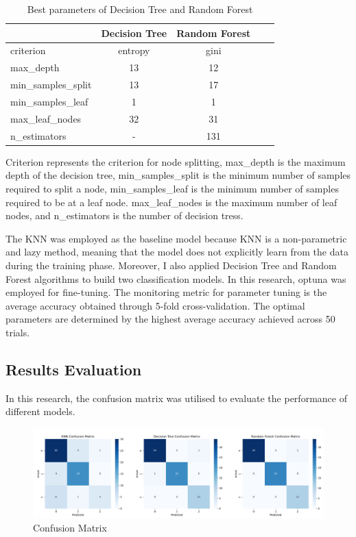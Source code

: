 \documentclass[a4paper,11pt]{article}
\begin{document}
\begin{table}[htbp]
	\centering
	\caption{Best parameters of Decision Tree and Random Forest}
	\begin{tabular}{lcccc}
		\toprule
		& Decision Tree & Random Forest\\
		\midrule
		criterion & entropy &gini \\
		max\_depth & 13 & 12\\
		min\_samples\_split & 13 & 17 \\
		min\_samples\_leaf & 1 & 1 \\
		max\_leaf\_nodes & 32 & 31 \\
        n\_estimators& - & 131 \\
		\bottomrule
	\end{tabular}
\end{table}


\noindent
Criterion represents the criterion for node splitting, max\_depth is the maximum depth of the decision tree,
min\_samples\_split is the minimum number of samples required to split a node, min\_samples\_leaf is the minimum number of samples required to be at a leaf node.
max\_leaf\_nodes is the maximum number of leaf nodes, and n\_estimators is the number of decision tress.


\noindent
The KNN was employed as the baseline model because KNN is a non-parametric and lazy method, meaning that the model does not explicitly 
learn from the data during the training phase. Moreover, I also applied Decision Tree and Random Forest algorithms to 
build two classification models. In this research, optuna was employed for fine-tuning. The monitoring metric for parameter tuning is 
the average accuracy obtained through 5-fold cross-validation. The optimal parameters are determined by the highest average accuracy 
achieved across 50 trials.

\subsection{Results Evaluation}
In this research, the confusion matrix was utilised to evaluate the performance of different models.

\begin{figure}[htbp]
    \centering
    \includegraphics[scale=0.32]{Confusion-Matrix.png}
    \caption{Confusion Matrix}
    \label{fig: }
\end{figure}
\end{document}
